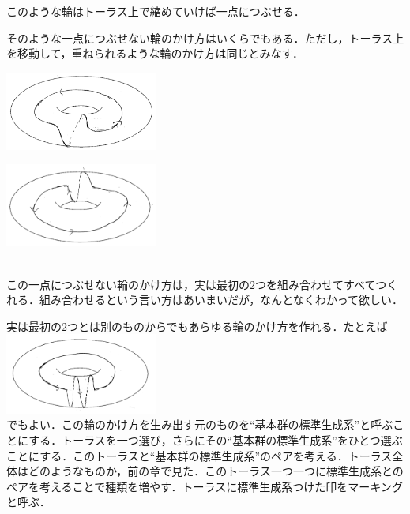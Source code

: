 このような輪はトーラス上で縮めていけば一点につぶせる．

そのような一点につぶせない輪のかけ方はいくらでもある．ただし，トーラス上を移動して，重ねられるような輪のかけ方は同じとみなす．
\\
\begin{minipage}{0.5\hsize}
\includegraphics[width=5cm]{asaka12.png}\\
\end{minipage}
\begin{minipage}{0.5\hsize}
\includegraphics[width=5cm]{asaka121.png}\\
\end{minipage}
\\
この一点につぶせない輪のかけ方は，実は最初の$2$つを組み合わせてすべてつくれる．組み合わせるという言い方はあいまいだが，なんとなくわかって欲しい．

実は最初の$2$つとは別のものからでもあらゆる輪のかけ方を作れる．たとえば\\
\includegraphics[width=5cm]{asaka14.png}\\
でもよい．この輪のかけ方を生み出す元のものを``基本群の標準生成系''と呼ぶことにする．トーラスを一つ選び，さらにその``基本群の標準生成系''をひとつ選ぶことにする．このトーラスと``基本群の標準生成系''のペアを考える．トーラス全体はどのようなものか，前の章で見た．このトーラス一つ一つに標準生成系とのペアを考えることで種類を増やす．トーラスに標準生成系つけた印をマーキングと呼ぶ．

